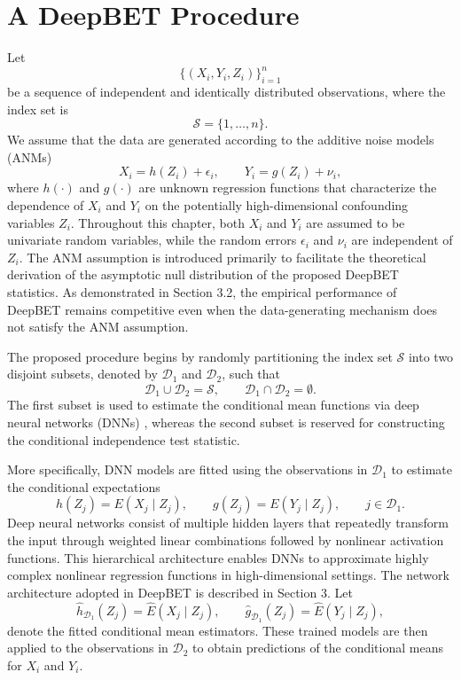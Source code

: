 \documentclass[12pt,reqno,oneside]{amsbook}
\theoremstyle{definition}
\theoremstyle{remark}
\begin{document}
\section{A DeepBET Procedure}
\label{deepbet_proc}

Let
\[
\{(X_i,Y_i,Z_i)\}_{i=1}^{n}
\]
be a sequence of independent and identically distributed observations, where the index set is
\[
\mathcal{S}=\{1,\ldots,n\}.
\]
We assume that the data are generated according to the additive noise models (ANMs)
\[
X_i=h(Z_i)+\epsilon_i,
\qquad
Y_i=g(Z_i)+\nu_i,
\]
where $h(\cdot)$ and $g(\cdot)$ are unknown regression functions that characterize the dependence of $X_i$ and $Y_i$ on the potentially high-dimensional confounding variables $Z_i$. Throughout this chapter, both $X_i$ and $Y_i$ are assumed to be univariate random variables, while the random errors $\epsilon_i$ and $\nu_i$ are independent of $Z_i$. The ANM assumption is introduced primarily to facilitate the theoretical derivation of the asymptotic null distribution of the proposed DeepBET statistics. As demonstrated in Section 3.2, the empirical performance of DeepBET remains competitive even when the data-generating mechanism does not satisfy the ANM assumption.

\hspace{0.5cm}
The proposed procedure begins by randomly partitioning the index set $\mathcal{S}$ into two disjoint subsets, denoted by $\mathcal{D}_1$ and $\mathcal{D}_2$, such that
\[
\mathcal{D}_1\cup\mathcal{D}_2=\mathcal{S},
\qquad
\mathcal{D}_1\cap\mathcal{D}_2=\emptyset.
\]
The first subset is used to estimate the conditional mean functions via deep neural networks (DNNs) \cite{LEE2021217}, whereas the second subset is reserved for constructing the conditional independence test statistic.

\hspace{0.5cm}
More specifically, DNN models are fitted using the observations in $\mathcal{D}_1$ to estimate the conditional expectations
\[
h(Z_j)=E(X_j\mid Z_j),
\qquad
g(Z_j)=E(Y_j\mid Z_j),
\qquad
j\in\mathcal{D}_1.
\]
Deep neural networks consist of multiple hidden layers that repeatedly transform the input through weighted linear combinations followed by nonlinear activation functions. This hierarchical architecture enables DNNs to approximate highly complex nonlinear regression functions in high-dimensional settings. The network architecture adopted in DeepBET is described in Section 3. Let
\[
\hat h_{\mathcal D_1}(Z_j)=\widehat E(X_j\mid Z_j),
\qquad
\hat g_{\mathcal D_1}(Z_j)=\widehat E(Y_j\mid Z_j),
\]
denote the fitted conditional mean estimators. These trained models are then applied to the observations in $\mathcal{D}_2$ to obtain predictions of the conditional means for $X_i$ and $Y_i$.
\end{document}
